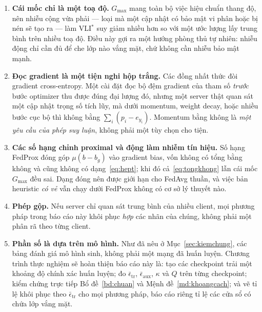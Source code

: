 \documentclass[11pt]{article}
\theoremstyle{remark}
\begin{document}
\begin{enumerate}
\item \textbf{Cái mốc chỉ là một toạ độ.} $G_{\max}$ mang toàn bộ việc hiệu
  chuẩn thang độ, nên nhiễu cộng vừa phải --- loại mà một cập nhật có bảo mật
  vi phân hoặc bị nén sẽ tạo ra --- làm VLI$^*$ suy giảm nhiều hơn so với một
  ước lượng lấy trung bình trên nhiều toạ độ. Điều này gợi ra một hướng phòng
  thủ tự nhiên: nhiễu động chỉ cần đủ để che lớp nào vắng mặt, chứ không cần
  nhiễu bảo mật mạnh.

\item \textbf{Đọc gradient là một tiện nghi hộp trắng.} Các đồng nhất thức
  đòi gradient cross-entropy. Một cài đặt đọc bộ đệm gradient của tham số
  \emph{trước} bước optimizer thu được đúng đại lượng đó, nhưng một server
  thật quan sát một cập nhật trọng số tích lũy, mà dưới momentum, weight
  decay, hoặc nhiều bước cục bộ thì không bằng $\sum_i(p_i-e_{y_i})$.
  Momentum bằng không là \emph{một yêu cầu của phép suy luận}, không phải một
  tùy chọn cho tiện.

\item \textbf{Các số hạng chỉnh proximal và động làm nhiễm tín hiệu.} Số hạng
  FedProx đóng góp $\mu(b-b_g)$ vào gradient bias, vốn không có tổng bằng
  không và cũng không có dạng~\eqref{eq:hept}; khi đó
  cả~\eqref{eq:tongkhong} lẫn cái mốc $G_{\max}$ đều sai. Dạng đóng nên được
  giới hạn cho FedAvg thuần, và việc bản heuristic \emph{có vẻ} vẫn chạy dưới
  FedProx không có cơ sở lý thuyết nào.

\item \textbf{Phép gộp.} Nếu server chỉ quan sát trung bình của nhiều client,
  mọi phương pháp trong báo cáo này khôi phục \emph{hợp} các nhãn của chúng,
  không phải một phân rã theo từng client.

\item \textbf{Phần số là dựa trên mô hình.} Như đã nêu ở
  Mục~\ref{sec:kiemchung}, các bảng đánh giá mô hình sinh, không phải một
  mạng đã huấn luyện. Chương trình thực nghiệm sẽ hoàn thiện báo cáo này là:
  tạo các checkpoint trải một khoảng độ chính xác huấn luyện; đo
  $\bar\epsilon_{\mathrm{tr}}$, $\bar\epsilon_{\mathrm{aux}}$, $\kappa$ và
  $Q$ trên từng checkpoint; kiểm chứng trực tiếp Bổ đề~\ref{bd:chuan} và
  Mệnh đề~\ref{md:khoangcach}; và vẽ tỉ lệ khôi phục theo
  $\bar\epsilon_{\mathrm{tr}}$ cho mọi phương pháp, báo cáo riêng tỉ lệ các
  cửa sổ có chứa lớp vắng mặt.
\end{enumerate}
\end{document}
